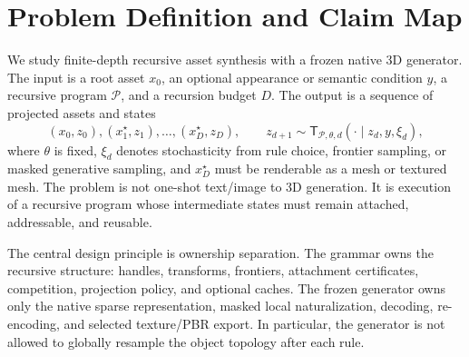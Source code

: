 %

\section{Problem Definition and Claim Map}


We study finite-depth recursive asset synthesis with a frozen native 3D
generator. The input is a root asset $x_0$, an optional appearance or semantic
condition $y$, a recursive program $\mathcal P$, and a recursion budget $D$.
The output is a sequence of projected assets and states
\begin{equation}
  (x_0,z_0), (x_1^\star,z_1),\ldots,(x_D^\star,z_D),
  \qquad
  z_{d+1}\sim
  \mathsf T_{\mathcal P,\theta,d}(\cdot\mid z_d,y,\xi_d),
\end{equation}
where $\theta$ is fixed, $\xi_d$ denotes stochasticity from rule choice,
frontier sampling, or masked generative sampling, and $x_D^\star$ must be
renderable as a mesh or textured mesh. The problem is not one-shot text/image
to 3D generation. It is execution of a recursive program whose intermediate
states must remain attached, addressable, and reusable.

The central design principle is ownership separation. The grammar owns the
recursive structure: handles, transforms, frontiers, attachment certificates,
competition, projection policy, and optional caches. The frozen generator owns
only the native sparse representation, masked local naturalization, decoding,
re-encoding, and selected texture/PBR export. In particular, the generator is
not allowed to globally resample the object topology after each rule.

